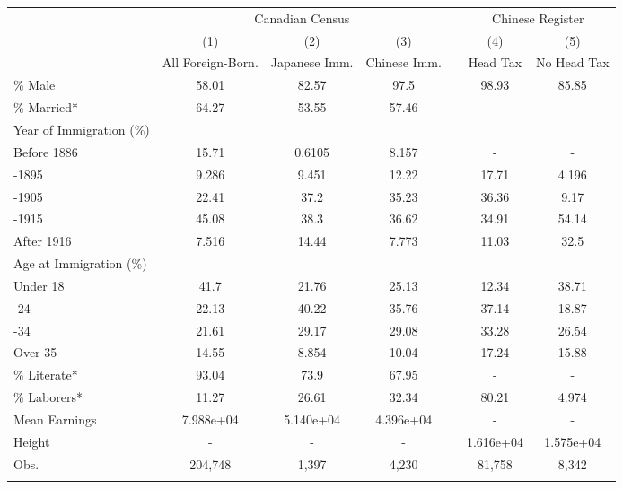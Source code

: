 \begin{tabular}{lcccccc}
\hhline{=======}
& \multicolumn{3}{c}{Canadian Census} & & \multicolumn{2}{c}{Chinese Register} \\ 
\hhline{~---~--}
& (1) & (2) & (3) & & (4) & (5) \\ 
& All Foreign-Born. & Japanese Imm. & Chinese Imm. & & Head Tax & No Head Tax \\ 
 \hhline{-------}
\% Male & 58.01&82.57& 97.5&&98.93&85.85 \\ 
\% Married* & 64.27&53.55&57.46&&-&- \\ 
Year of Immigration (\%)&&&&&&\\
\;\; Before 1886 & 15.71&0.6105&8.157&&-&- \\ 
\;\; 1886-1895 & 9.286&9.451&12.22&&17.71&4.196 \\ 
\;\; 1896-1905 & 22.41& 37.2&35.23&&36.36& 9.17 \\ 
\;\; 1906-1915 & 45.08& 38.3&36.62&&34.91&54.14 \\ 
\;\;After 1916 & 7.516&14.44&7.773&&11.03& 32.5 \\ 
Age at Immigration (\%)&&&&&&\\
\;\; Under 18 &  41.7&21.76&25.13&&12.34&38.71 \\ 
\;\; 18-24 & 22.13&40.22&35.76&&37.14&18.87 \\ 
\;\; 25-34 & 21.61&29.17&29.08&&33.28&26.54 \\ 
\;\; Over 35 & 14.55&8.854&10.04&&17.24&15.88 \\ 
\% Literate* & 93.04& 73.9&67.95&&-&- \\ 
\% Laborers* & 11.27&26.61&32.34&&80.21&4.974 \\ 
Mean Earnings & 7.988e+04&5.140e+04&4.396e+04&&-&- \\ 
Height & -&-&-&&1.616e+04&1.575e+04 \\ 
Obs.
&
204,748&1,397&4,230&&81,758&8,342
\\ 
\hhline{-------}
\end{tabular}
